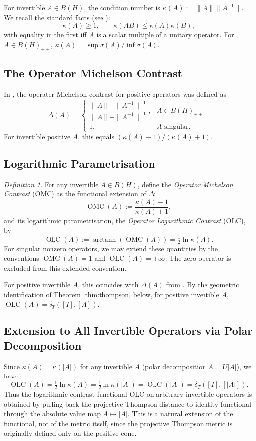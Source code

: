 \documentclass{article}
\theoremstyle{remark}
\newtheorem{definition}[theorem]{Definition}
\providecommand{\QLC}{\operatorname{OLC}}
\providecommand{\QMC}{\operatorname{OMC}}
\begin{document}
For invertible $A\in B(H)$, the condition number is $\kappa(A):=\|A\|\|A^{-1}\|$. We recall the standard facts (see \cite{dixmier1969}):
\[
\kappa(A)\ge1,\qquad \kappa(AB)\le\kappa(A)\kappa(B),
\]
with equality in the first iff $A$ is a scalar multiple of a unitary operator. For $A\in B(H)_{++}$, $\kappa(A) = \sup\sigma(A)/\inf\sigma(A)$.

\subsection{The Operator Michelson Contrast}
In \cite{abed2024}, the operator Michelson contrast for positive operators was defined as
\[
\Delta(A) = \begin{cases} \dfrac{\|A\|-\|A^{-1}\|^{-1}}{\|A\|+\|A^{-1}\|^{-1}}, & A\in B(H)_{++},\\[2mm] 1, & A \text{ singular}. \end{cases}
\]
For invertible positive $A$, this equals $(\kappa(A)-1)/(\kappa(A)+1)$.

\subsection{Logarithmic Parametrisation}

\begin{definition}\label{def:qmc}
For any invertible $A\in B(H)$, define the \emph{Operator Michelson Contrast} (OMC) as the functional extension of $\Delta$:
\[
\QMC(A) := \frac{\kappa(A)-1}{\kappa(A)+1},
\]
and its logarithmic parametrisation, the \emph{Operator Logarithmic Contrast} (OLC), by
\[
\QLC(A) := \operatorname{arctanh}(\QMC(A)) = \tfrac12\ln\kappa(A).
\]
For singular nonzero operators, we may extend these quantities by the conventions $\QMC(A)=1$ and $\QLC(A)=+\infty$. The zero operator is excluded from this extended convention.
\end{definition}

For positive invertible $A$, this coincides with $\Delta(A)$ from \cite{abed2024}. By the geometric identification of Theorem \ref{thm:thompson} below, for positive invertible $A$, $\QLC(A)=\delta_T([I],[A])$.

\subsection{Extension to All Invertible Operators via Polar Decomposition}
Since $\kappa(A)=\kappa(|A|)$ for any invertible $A$ (polar decomposition $A=U|A|$), we have
\[
\QLC(A) = \tfrac12\ln\kappa(A) = \tfrac12\ln\kappa(|A|) = \QLC(|A|) = \delta_T([I],[|A|]).
\]
Thus the logarithmic contrast functional OLC on arbitrary invertible operators is obtained by pulling back the projective Thompson distance-to-identity functional through the absolute value map $A\mapsto|A|$. This is a natural extension of the functional, not of the metric itself, since the projective Thompson metric is originally defined only on the positive cone.
\end{document}
